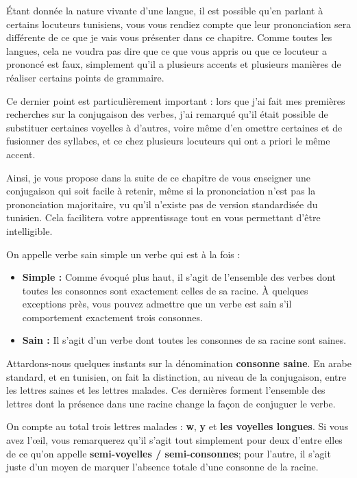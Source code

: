 Étant donnée la nature vivante d'une langue, il est possible qu'en parlant à certains locuteurs tunisiens, vous vous rendiez compte que leur prononciation sera différente de ce que je vais vous présenter dans ce chapitre. Comme toutes les langues, cela ne voudra pas dire que ce que vous appris ou que ce locuteur a prononcé est faux, simplement qu'il a plusieurs accents et plusieurs manières de réaliser certains points de grammaire. 

Ce dernier point est particulièrement important : lors que j'ai fait mes premières recherches sur la conjugaison des verbes, j'ai remarqué qu'il était possible de substituer certaines voyelles à d'autres, voire même d'en omettre certaines et de fusionner des syllabes, et ce chez plusieurs locuteurs qui ont a priori le même accent. 

Ainsi, je vous propose dans la suite de ce chapitre de vous enseigner une conjugaison qui soit facile à retenir, même si la prononciation n'est pas la prononciation majoritaire, vu qu'il n'existe pas de version standardisée du tunisien. Cela facilitera votre apprentissage tout en vous permettant d'être intelligible.

On appelle verbe sain simple un verbe qui est à la fois : 
\begin{itemize}
    \item \textbf{Simple :} Comme évoqué plus haut, il s'agit de l'ensemble des verbes dont toutes les consonnes sont exactement celles de sa racine. À quelques exceptions près, vous pouvez admettre que un verbe est sain s'il comportement exactement trois consonnes.
    \item \textbf{Sain :} Il s'agit d'un verbe dont toutes les consonnes de sa racine sont saines.
\end{itemize}

Attardons-nous quelques instants sur la dénomination \textbf{consonne saine}. En arabe standard, et en tunisien, on fait la distinction, au niveau de la conjugaison, entre les lettres saines et les lettres malades. Ces dernières forment l'ensemble des lettres dont la présence dans une racine change la façon de conjuguer le verbe. 

On compte au total trois lettres malades : \textbf{w}, \textbf{y} et \textbf{les voyelles longues}. Si vous avez l'\oe il, vous remarquerez qu'il s'agit tout simplement pour deux d'entre elles de ce qu'on appelle \textbf{semi-voyelles / semi-consonnes}; pour l'autre, il s'agit juste d'un moyen de marquer l'absence totale d'une consonne de la racine.

